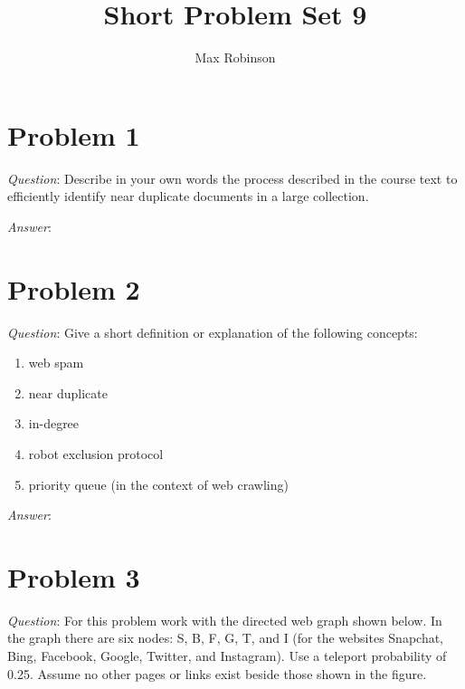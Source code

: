 \documentclass{article}
\begin{document}
\title{Short Problem Set 9}
\author{Max Robinson}
\date{}
\maketitle

\section{Problem 1}
\noindent \textit{Question}:  Describe in your own words the process described in the course text to efficiently identify near duplicate documents in a large collection.
\newline

\noindent
\textit{Answer}:


\section{Problem 2}
\noindent \textit{Question}:  Give a short definition or explanation of the following concepts:
\begin{enumerate}
\item web spam
\item near duplicate
\item in-degree
\item robot exclusion protocol
\item priority queue (in the context of web crawling)
\end{enumerate}


\noindent
\textit{Answer}:


\section{Problem 3}
\noindent
\textit{Question}: For this problem work with the directed web graph shown below. In the graph there are six nodes: S, B, F, G, T, and I (for the websites Snapchat, Bing, Facebook, Google, Twitter, and Instagram). Use a teleport probability of 0.25. Assume no other pages or links exist beside those shown in the figure.
\end{document}
